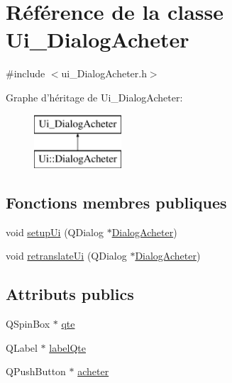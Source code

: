 \hypertarget{class_ui___dialog_acheter}{\section{Référence de la classe Ui\-\_\-\-Dialog\-Acheter}
\label{class_ui___dialog_acheter}
}


{\ttfamily \#include $<$ui\-\_\-\-Dialog\-Acheter.\-h$>$}

Graphe d'héritage de Ui\-\_\-\-Dialog\-Acheter\-:\begin{figure}[H]
\begin{center}
\leavevmode
\includegraphics[height=2.000000cm]{class_ui___dialog_acheter}
\end{center}
\end{figure}
\subsection*{Fonctions membres publiques}
\begin{DoxyCompactItemize}
\item 
void \hyperlink{class_ui___dialog_acheter_a440e87b6caad07792b74ae02d844eb16}{setup\-Ui} (Q\-Dialog $\ast$\hyperlink{class_dialog_acheter}{Dialog\-Acheter})
\item 
void \hyperlink{class_ui___dialog_acheter_a461ef24b6f4686f42a1fe3db67a3fb03}{retranslate\-Ui} (Q\-Dialog $\ast$\hyperlink{class_dialog_acheter}{Dialog\-Acheter})
\end{DoxyCompactItemize}
\subsection*{Attributs publics}
\begin{DoxyCompactItemize}
\item 
Q\-Spin\-Box $\ast$ \hyperlink{class_ui___dialog_acheter_a21affb75243ff68116a045006c8ac3f6}{qte}
\item 
Q\-Label $\ast$ \hyperlink{class_ui___dialog_acheter_adfd72bae8a9c183780299127920f4438}{label\-Qte}
\item 
Q\-Push\-Button $\ast$ \hyperlink{class_ui___dialog_acheter_af6b53b197038b75c9c93a5a2bd7775a4}{acheter}
\end{DoxyCompactItemize}


